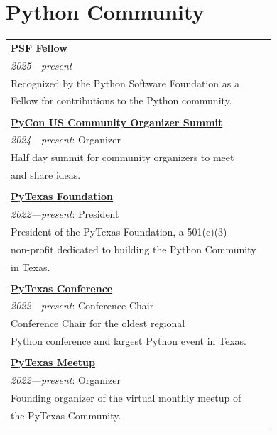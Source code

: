 \documentclass[10pt]{article} %
\newcommand\tab[1][1cm]{\hspace*{#1}}
\begin{document}
\begin{minipage}[t]{0.44\textwidth}
\section{Python Community}

\begin{tabular}{ll}
\textbf{\href{https://www.python.org/psf/fellows-roster/}{PSF Fellow}}\\
\tab\textit{2025—present}\\
\tab Recognized by the Python Software Foundation as a  \\
\tab Fellow for contributions to the Python community. \\
\\

\textbf{\href{https://us.pycon.org/2025/events/community-organizers-summit/}{PyCon US Community Organizer Summit}}\\
\tab\textit{2024—present}: Organizer\\
\tab Half day summit for community organizers to meet  \\
\tab and share ideas. \\
\\

\textbf{\href{https://pytexas.org}{PyTexas Foundation}}\\
\tab\textit{2022—present}: President\\
\tab President of the PyTexas Foundation, a 501(c)(3)    \\
\tab non-profit dedicated to building the Python Community \\
\tab in Texas. \\
\\

\textbf{\href{https://pytexas.org/2024}{PyTexas Conference}}\\
\tab\textit{2022—present}: Conference  Chair\\
\tab Conference Chair for the oldest regional   \\
\tab Python conference and largest Python event in Texas. \\
\\

\textbf{\href{https://pytexas.org/meetup}{PyTexas Meetup}}\\
\tab\textit{2022—present}: Organizer\\
\tab Founding organizer of the virtual monthly meetup of   \\
\tab the PyTexas Community. \\
\\

\end{tabular}\\
    
\end{minipage} %
\end{document}
